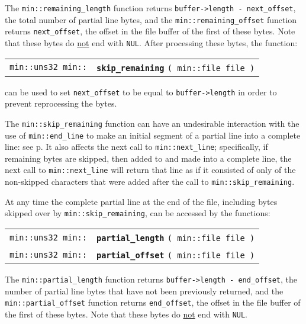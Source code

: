 \documentclass[12pt]{article}
\makeatletter
\newcommand{\ttindex}[1]{\index{#1@{\tt #1}}}
\newcommand{\minindex}[1]{\ttindex{min::#1}\ttindex{#1}}
\newcommand{\pagref}[1]{p\pageref{#1}}
\newcommand{\EOL}{\penalty \exhyphenpenalty}
\newenvironment{indpar}[1][0.3in]%
	{\begin{list}{}%
		     {\setlength{\itemsep}{0in}%
		      \setlength{\topsep}{0in}%
		      \setlength{\parsep}{1ex}%
		      \setlength{\labelwidth}{#1}%
		      \setlength{\leftmargin}{#1}%
		      \addtolength{\leftmargin}{\labelsep}}%
	 \item}%
	{\end{list}}
\newcommand{\LABEL}[1]{\label{#1}}
\newcommand{\MINKEY}[1]{{\tt \bf #1}\minindex{#1}}
\makeatother
\begin{document}
The {\tt min::\EOL remaining\_\EOL length}
function returns {\tt  buffer->\EOL length - next\_\EOL offset},
the total number of partial line bytes, and
the {\tt min::\EOL remaining\_\EOL offset} function returns
{\tt next\_\EOL offset},
the offset in the file buffer of the first of these bytes.
Note that these bytes do \underline{not} end with {\tt NUL}.
After processing these bytes, the function:

\begin{indpar}[1em]\begin{tabular}{r@{}l}
\verb|min::uns32 min::|
    & \MINKEY{skip\_\EOL remaining} \verb|( min::file file )|
\LABEL{MIN::SKIP_REMAINING} \\
\end{tabular}\end{indpar}

can be used to set {\tt next\_\EOL offset}
to be equal to {\tt buffer->\EOL length} in order to
prevent reprocessing the bytes.

The {\tt min::skip\_remaining} function can have an undesirable
interaction with the use of {\tt min::\EOL end\_\EOL line} to
make an initial segment of a partial line into a complete line:
see \pagref{SKIP_REMAINING_END_LINE}.  It also affects the next
call to {\tt min::\EOL next\_\EOL line}; specifically, if remaining
bytes are skipped, then added to and made into a complete line,
the next call to {\tt min::\EOL next\_\EOL line} will return that line as if
it consisted of only of the non-skipped characters that were added
after the call to {\tt min::\EOL skip\_\EOL remaining}.

At any time the complete partial line at the end of the file, including
bytes skipped over by {\tt min::\EOL skip\_\EOL remaining}, can be
accessed by the functions:

\begin{indpar}[1em]\begin{tabular}{r@{}l}
\verb|min::uns32 min::|
    & \MINKEY{partial\_\EOL length} \verb|( min::file file )|
\LABEL{MIN::PARTIAL_LENGTH} \\
\verb|min::uns32 min::|
    & \MINKEY{partial\_\EOL offset} \verb|( min::file file )|
\LABEL{MIN::PARTIAL_OFFSET} \\
\end{tabular}\end{indpar}

The {\tt min::\EOL partial\_\EOL length}
function returns {\tt  buffer->\EOL length - end\_\EOL offset},
the number of partial line bytes that have not
been previously returned, and
the {\tt min::\EOL partial\_\EOL offset} function returns
{\tt end\_\EOL offset},
the offset in the file buffer of the first of these bytes.
Note that these bytes do \underline{not} end with {\tt NUL}.
\end{document}
